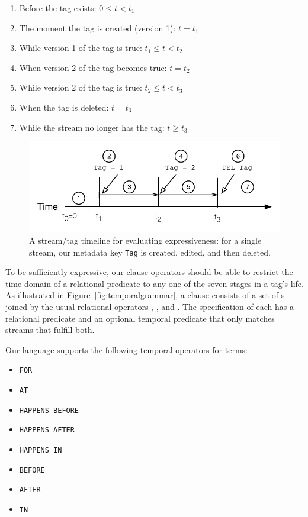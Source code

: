 \begin{enumerate}
\item Before the tag exists: $0 \leq t < t_1$
\item The moment the tag is created (version 1): $t = t_1$
\item While version 1 of the tag is true: $t_1 \leq t < t_2$
\item When version 2 of the tag becomes true: $t = t_2$
\item While version 2 of the tag is true: $t_2 \leq t < t_3$
\item When the tag is deleted: $t = t_3$
\item While the stream no longer has the tag: $t \geq t_3$
\end{enumerate}

\begin{figure}
\centering
\includegraphics[width=.9\linewidth]{figs/expressivemodel.pdf}
\caption{A stream/tag timeline for evaluating expressiveness: for a single stream, our metadata key \texttt{Tag} is
created, edited, and then deleted.}
\label{fig:expressivemodel}
\end{figure}

To be sufficiently expressive, our  clause operators should be
able to restrict the time domain of a relational predicate to any one of the
seven stages in a tag's life. As illustrated in
Figure~\ref{fig:temporalgrammar}, a  clause consists of a set
of s joined by the usual relational operators
, , and .  The specification of each
 has a relational predicate and an optional temporal
predicate that only matches streams that fulfill both.

Our language supports the following temporal operators for  terms:

\begin{itemize}
\item \texttt{FOR}
\item \texttt{AT}
\item \texttt{HAPPENS BEFORE}
\item \texttt{HAPPENS AFTER}
\item \texttt{HAPPENS IN}
\item \texttt{BEFORE}
\item \texttt{AFTER}
\item \texttt{IN}
\end{itemize}

